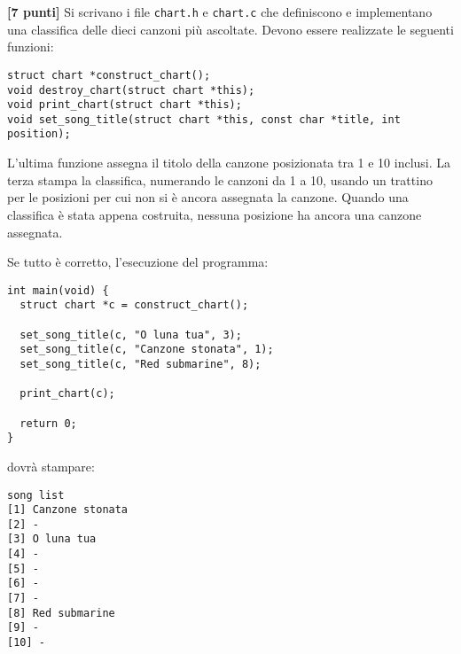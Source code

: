 \documentclass{article}[10pt]
\newcounter{esnu}
\newenvironment{esercizio}{\medskip \noindent {\bf Esercizio\addtocounter{esnu}{1} \arabic{esnu}}}{}
\begin{document}
\begin{esercizio}
\textbf{[7 punti]}
Si scrivano i file \texttt{chart.h} e \texttt{chart.c} che definiscono e implementano
una classifica delle dieci canzoni pi\`u ascoltate. Devono essere realizzate le
seguenti funzioni:

{\small
\begin{verbatim}
struct chart *construct_chart();
void destroy_chart(struct chart *this);
void print_chart(struct chart *this);
void set_song_title(struct chart *this, const char *title, int position); 
\end{verbatim}
}

\noindent
L'ultima funzione assegna il titolo della canzone posizionata tra 1 e 10 inclusi.
La terza stampa la classifica, numerando
le canzoni da 1 a 10, usando un trattino per le posizioni per cui non si \`e ancora assegnata la canzone.
Quando una classifica \`e stata appena costruita, nessuna posizione ha ancora una canzone assegnata.

Se tutto \`e corretto, l'esecuzione del programma:

{\small
\begin{verbatim}
int main(void) {
  struct chart *c = construct_chart();

  set_song_title(c, "O luna tua", 3);
  set_song_title(c, "Canzone stonata", 1);
  set_song_title(c, "Red submarine", 8);

  print_chart(c);

  return 0;
}

\end{verbatim}
}
\noindent
dovr\`a stampare:

{\small
\begin{verbatim}
song list
[1] Canzone stonata
[2] -
[3] O luna tua
[4] -
[5] -
[6] -
[7] -
[8] Red submarine
[9] -
[10] -
\end{verbatim}
}
%
\end{esercizio}
%
\end{document}
